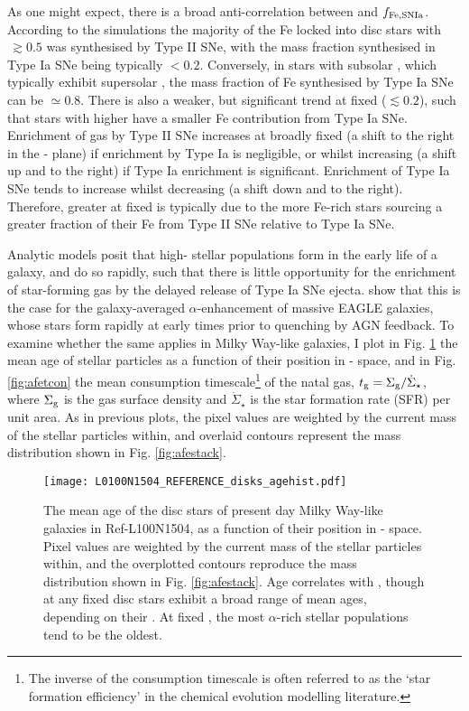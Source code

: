 As one might expect, there is a broad anti-correlation between \afe{} and $f_{\rm Fe,SNIa}$. According to the simulations the majority of the Fe locked into disc stars with \afe{}$\,\gtrsim 0.5$ was synthesised by Type II SNe, with the mass fraction synthesised in Type Ia SNe being typically $< 0.2$. Conversely, in stars with subsolar \afe{}, which typically exhibit supersolar \feh{}, the mass fraction of Fe synthesised by Type Ia SNe can be $\simeq 0.8$. There is also a weaker, but significant trend at fixed \afe{} ($\lesssim 0.2$), such that stars with higher \feh{} have a smaller Fe contribution from Type Ia SNe. Enrichment of gas by Type II SNe increases \feh{} at broadly fixed \afe{} (a shift to the right in the \afe{}-\feh{} plane) if enrichment by Type Ia is negligible, or whilst increasing \afe{} (a shift up and to the right) if Type Ia enrichment is significant. Enrichment of Type Ia SNe tends to increase \feh{} whilst decreasing \afe{} (a shift down and to the right). Therefore, greater \feh{} at fixed \afe{} is typically due to the more Fe-rich stars sourcing a greater fraction of their Fe from Type II SNe relative to Type Ia SNe. 

Analytic models posit that high-\afe{} stellar populations form in the early life of a galaxy, and do so rapidly, such that there is little opportunity for the enrichment of star-forming gas by the delayed release of Type Ia SNe ejecta. \citet{2016MNRAS.461L.102S} show that this is the case for the galaxy-averaged $\alpha$-enhancement of massive EAGLE galaxies, whose stars form rapidly at early times prior to quenching by AGN feedback. To examine whether the same applies in Milky Way-like galaxies, I plot in Fig. \ref{fig:afeages} the mean age of stellar particles as a function of their position in \afe{}-\feh{} space, and in Fig. \ref{fig:afetcon} the mean consumption timescale\footnote{The inverse of the consumption timescale is often referred to as the `star formation efficiency' in the chemical evolution modelling literature.} of the natal gas, $t_{\rm g} = \Sigma_{\rm g}/\dot{\Sigma}_\star$, where $\Sigma_{\rm g}$ is the gas surface density and $\dot{\Sigma}_\star$ is the star formation rate (SFR) per unit area. As in previous plots, the pixel values are weighted by the current mass of the stellar particles within, and overlaid contours represent the mass distribution shown in Fig. \ref{fig:afestack}. 

\begin{figure}
\texttt{[image: L0100N1504\_REFERENCE\_disks\_agehist.pdf]}
\caption[Mean stellar age as a function of \afe{} and \feh{} for disc stars in Ref-L100N1504]{\label{fig:afeages} The mean age of the disc stars of present day Milky Way-like galaxies in Ref-L100N1504, as a function of their position in \afe{}-\feh{} space. Pixel values are weighted by the current mass of the stellar particles within, and the overplotted contours reproduce the mass distribution shown in Fig. \ref{fig:afestack}. Age correlates with \afe{}, though at any fixed \afe{} disc stars exhibit a broad range of mean ages, depending on their \feh{}. At fixed \feh{}, the most $\alpha$-rich stellar populations tend to be the oldest.}
\end{figure}

